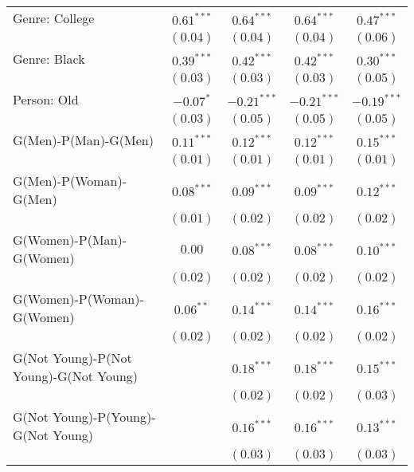 \begin{center}
\begin{longtable}{l c c c c}
Genre: College                         & $0.61^{***}$  & $0.64^{***}$  & $0.64^{***}$  & $0.47^{***}$  \\
                                       & $(0.04)$      & $(0.04)$      & $(0.04)$      & $(0.06)$      \\
Genre: Black                           & $0.39^{***}$  & $0.42^{***}$  & $0.42^{***}$  & $0.30^{***}$  \\
                                       & $(0.03)$      & $(0.03)$      & $(0.03)$      & $(0.05)$      \\
Person: Old                            & $-0.07^{*}$   & $-0.21^{***}$ & $-0.21^{***}$ & $-0.19^{***}$ \\
                                       & $(0.03)$      & $(0.05)$      & $(0.05)$      & $(0.05)$      \\
G(Men)-P(Man)-G(Men)                   & $0.11^{***}$  & $0.12^{***}$  & $0.12^{***}$  & $0.15^{***}$  \\
                                       & $(0.01)$      & $(0.01)$      & $(0.01)$      & $(0.01)$      \\
G(Men)-P(Woman)-G(Men)                 & $0.08^{***}$  & $0.09^{***}$  & $0.09^{***}$  & $0.12^{***}$  \\
                                       & $(0.01)$      & $(0.02)$      & $(0.02)$      & $(0.02)$      \\
G(Women)-P(Man)-G(Women)               & $0.00$        & $0.08^{***}$  & $0.08^{***}$  & $0.10^{***}$  \\
                                       & $(0.02)$      & $(0.02)$      & $(0.02)$      & $(0.02)$      \\
G(Women)-P(Woman)-G(Women)             & $0.06^{**}$   & $0.14^{***}$  & $0.14^{***}$  & $0.16^{***}$  \\
                                       & $(0.02)$      & $(0.02)$      & $(0.02)$      & $(0.02)$      \\
G(Not Young)-P(Not Young)-G(Not Young) &               & $0.18^{***}$  & $0.18^{***}$  & $0.15^{***}$  \\
                                       &               & $(0.02)$      & $(0.02)$      & $(0.03)$      \\
G(Not Young)-P(Young)-G(Not Young)     &               & $0.16^{***}$  & $0.16^{***}$  & $0.13^{***}$  \\
                                       &               & $(0.03)$      & $(0.03)$      & $(0.03)$      \\

\end{longtable}
\end{center}
